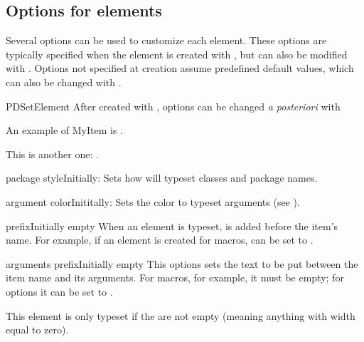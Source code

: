 \documentclass[11pt]{article}
\begin{document}
\subsection{Options for elements}\label{sec:options-for-elements}

Several options can be used to customize each element. These options are typically specified when the element is created with , but can also be modified with . Options not specified at creation assume predefined default values, which can also be changed with .

\begin{Macrodef}{PDSetElement}{}{}
    After created with , options can be changed \textit{a posteriori} with 
\end{Macrodef}

\begin{PDExample}
    An example of MyItem is .\par
    This is another one: .
\end{PDExample}

\begin{Optiondef}{package style}{}{Initially: }
    Sets how  will typeset classes and package names.
\end{Optiondef}

\begin{Optiondef}{argument color}{}{Inititally: }
    Sets the color to typeset arguments (see ).
\end{Optiondef}

\begin{Optiondef}{prefix}{}{Initially empty}
    When an element is typeset,  is added before the item's name. For example, if an element is created for macros,  can be set to .
\end{Optiondef}

\begin{Optiondef}{arguments prefix}{}{Initially empty}
    This options sets the text to be put between the item name and its arguments. For macros, for example, it must be empty; for options it can be set to \PDInline{=}.

    This element is only typeset if the  are not empty (meaning anything with width equal to zero).
\end{Optiondef}
\end{document}
